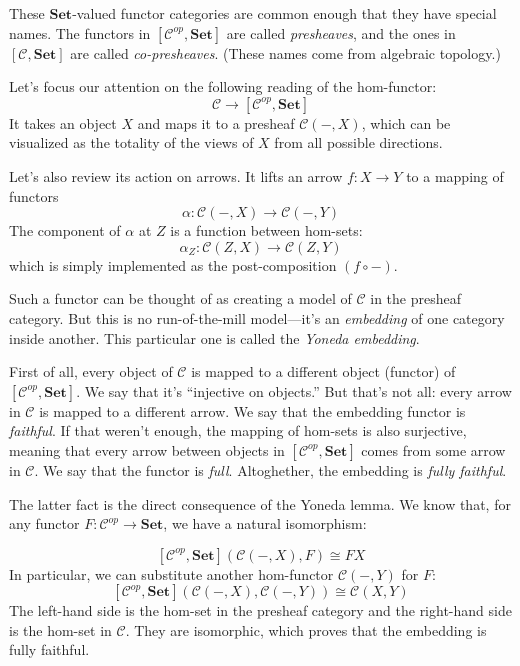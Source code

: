 \documentclass[DaoFP]{subfiles}
\begin{document}
These $\mathbf{Set}$-valued functor categories are common enough that they have special names. The functors in $[\mathcal{C}^{op},  \mathbf{Set}]$ are called \emph{presheaves}, and the ones in $[\mathcal{C},  \mathbf{Set}]$ are called \emph{co-presheaves}. (These names come from algebraic topology.)

Let's focus our attention on the following reading of the hom-functor:
\[ \mathcal{C} \to [\mathcal{C}^{op},  \mathbf{Set}] \]
It takes an object $X$ and maps it to a presheaf $\mathcal{C}(-, X)$, which can be visualized as the totality of the views of $X$ from all possible directions.

Let's also review its action on arrows. It lifts an arrow $f \colon X \to Y$ to a mapping of functors
\[ \alpha \colon \mathcal{C}(-, X) \to \mathcal{C}(-, Y) \]
The component of $\alpha$ at $Z$ is a function between hom-sets:
\[ \alpha_Z \colon \mathcal{C}(Z, X) \to \mathcal{C}(Z, Y) \]
which is simply implemented as the post-composition $(f \circ -)$.

Such a functor can be thought of as creating a model of $\mathcal{C}$ in the presheaf category. But this is no run-of-the-mill model---it's an \emph{embedding} of one category inside another. This particular one is called the \emph{Yoneda embedding}. 

First of all, every object of $\mathcal{C}$ is mapped to a different object (functor) of $[\mathcal{C}^{op},  \mathbf{Set}]$. We say that it's ``injective on objects.'' But that's not all: every arrow in $\mathcal{C}$ is mapped to a different arrow. We say that the embedding functor is \emph{faithful}. If that weren't enough, the mapping of hom-sets is also surjective, meaning that every arrow between objects in $[\mathcal{C}^{op},  \mathbf{Set}]$ comes from some arrow in $\mathcal{C}$. We say that the functor is \emph{full}. Altoghether, the embedding is \emph{fully faithful}.

The latter fact is the direct consequence of the Yoneda lemma. We know that, for any functor $F \colon \mathcal{C}^{op} \to \mathbf{Set}$, we have a natural isomorphism:

\[ [\mathcal{C}^{op}, \mathbf{Set}]( \mathcal{C}(-, X), F) \cong F X \]
In particular, we can substitute another hom-functor $\mathcal{C}(-, Y)$ for $F$:
\[ [\mathcal{C}^{op}, \mathbf{Set}]( \mathcal{C}(-, X), \mathcal{C}(-, Y)) \cong \mathcal{C}(X, Y)\]
The left-hand side is the hom-set in the presheaf category and the right-hand side is the hom-set in $\mathcal{C}$. They are isomorphic, which proves that the embedding is fully faithful.
\end{document}
